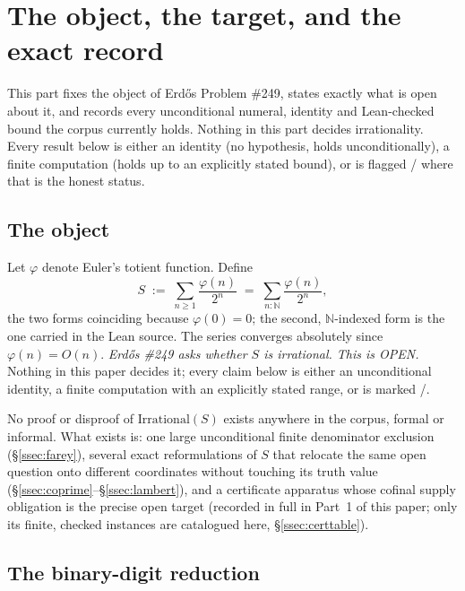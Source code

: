 \section{The object, the target, and the exact record}

This part fixes the object of Erd\H{o}s Problem \#249, states exactly what is
open about it, and records every unconditional numeral, identity and
Lean-checked bound the corpus currently holds. Nothing in this part decides
irrationality. Every result below is either an identity (no hypothesis, holds
unconditionally), a finite computation (holds up to an explicitly stated
bound), or is flagged / where that is the honest status.

\subsection{The object}

\begin{defn}
\label{defn:S}
Let $\varphi$ denote Euler's totient function. Define
\[
S \;:=\; \sum_{n \ge 1} \frac{\varphi(n)}{2^{n}} \;=\; \sum_{n : \mathbb{N}} \frac{\varphi(n)}{2^{n}},
\]
the two forms coinciding because $\varphi(0)=0$; the second, $\mathbb{N}$-indexed
form is the one carried in the Lean source. The series converges absolutely
since $\varphi(n) = O(n)$. \emph{Erd\H{o}s \#249 asks whether $S$ is irrational.
This is OPEN.} Nothing in this paper decides it; every claim below is either an
unconditional identity, a finite computation with an explicitly stated range,
or is marked /.
\end{defn}

\begin{rem}[Status]
No proof or disproof of $\mathrm{Irrational}(S)$ exists anywhere in the corpus,
formal or informal. What exists is: one large unconditional finite denominator
exclusion (\S\ref{ssec:farey}), several exact reformulations of $S$ that
relocate the same open question onto different coordinates without touching
its truth value (\S\ref{ssec:coprime}--\S\ref{ssec:lambert}), and a certificate
apparatus whose cofinal supply obligation is the precise open target
(recorded in full in Part~1 of this paper; only its finite, checked instances
are catalogued here, \S\ref{ssec:certtable}).
\end{rem}

\subsection{The binary-digit reduction}

